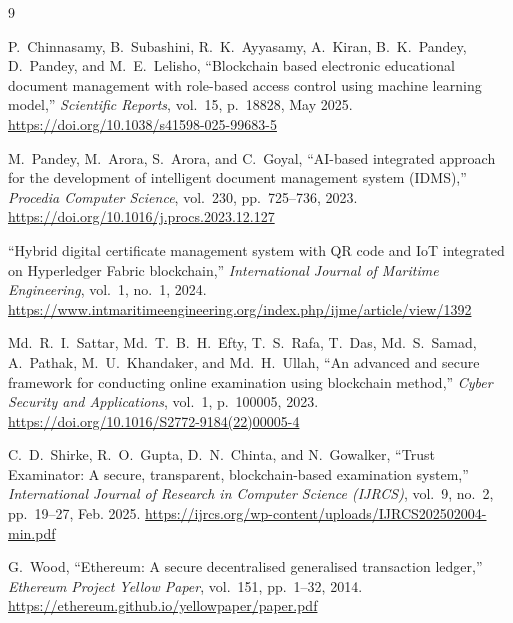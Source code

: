 \documentclass[conference]{IEEEtran}
\begin{document}
\begin{thebibliography}{9}

P.~Chinnasamy, B.~Subashini, R.~K.~Ayyasamy, A.~Kiran, B.~K.~Pandey,
D.~Pandey, and M.~E.~Lelisho,
``Blockchain based electronic educational document management with role-based
access control using machine learning model,''
\textit{Scientific Reports}, vol.~15, p.~18828, May 2025.
\url{https://doi.org/10.1038/s41598-025-99683-5}

M.~Pandey, M.~Arora, S.~Arora, and C.~Goyal,
``AI-based integrated approach for the development of intelligent document
management system (IDMS),''
\textit{Procedia Computer Science}, vol.~230, pp.~725--736, 2023.
\url{https://doi.org/10.1016/j.procs.2023.12.127}

``Hybrid digital certificate management system with QR code and IoT integrated
on Hyperledger Fabric blockchain,''
\textit{International Journal of Maritime Engineering}, vol.~1, no.~1, 2024.
\url{https://www.intmaritimeengineering.org/index.php/ijme/article/view/1392}

Md.~R.~I.~Sattar, Md.~T.~B.~H.~Efty, T.~S.~Rafa, T.~Das, Md.~S.~Samad,
A.~Pathak, M.~U.~Khandaker, and Md.~H.~Ullah,
``An advanced and secure framework for conducting online examination using
blockchain method,''
\textit{Cyber Security and Applications}, vol.~1, p.~100005, 2023.
\url{https://doi.org/10.1016/S2772-9184(22)00005-4}

C.~D.~Shirke, R.~O.~Gupta, D.~N.~Chinta, and N.~Gowalker,
``Trust Examinator: A secure, transparent, blockchain-based examination
system,''
\textit{International Journal of Research in Computer Science (IJRCS)},
vol.~9, no.~2, pp.~19--27, Feb. 2025.
\url{https://ijrcs.org/wp-content/uploads/IJRCS202502004-min.pdf}

G.~Wood,
``Ethereum: A secure decentralised generalised transaction ledger,''
\textit{Ethereum Project Yellow Paper}, vol.~151, pp.~1--32, 2014.
\url{https://ethereum.github.io/yellowpaper/paper.pdf}

\end{thebibliography}
\end{document}
